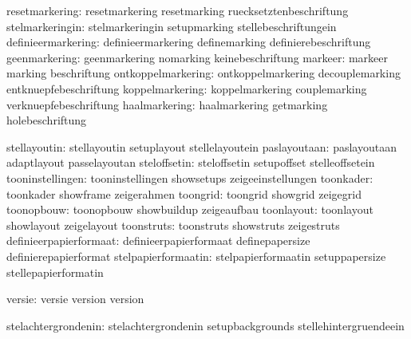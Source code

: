                resetmarkering:  resetmarkering               resetmarking
                                ruecksetztenbeschriftung
              stelmarkeringin:  stelmarkeringin              setupmarking
                                stellebeschriftungein
           definieermarkering:  definieermarkering           definemarking
                                definierebeschriftung
                geenmarkering:  geenmarkering                nomarking
                                keinebeschriftung
                      markeer:  markeer                      marking
                                beschriftung
           ontkoppelmarkering:  ontkoppelmarkering           decouplemarking
                                entknuepfebeschriftung
              koppelmarkering:  koppelmarkering              couplemarking
                                verknuepfebeschriftung
                haalmarkering:  haalmarkering                getmarking
                                holebeschriftung

                 stellayoutin:  stellayoutin                 setuplayout
                                stellelayoutein
                 paslayoutaan:  paslayoutaan                 adaptlayout
                                passelayoutan
                 steloffsetin:  steloffsetin                 setupoffset
                                stelleoffsetein
             tooninstellingen:  tooninstellingen             showsetups
                                zeigeeinstellungen
                    toonkader:  toonkader                    showframe
                                zeigerahmen
                     toongrid:  toongrid                     showgrid
                                zeigegrid  
                   toonopbouw:  toonopbouw                   showbuildup
                                zeigeaufbau
                   toonlayout:  toonlayout                   showlayout
                                zeigelayout
                   toonstruts:  toonstruts                   showstruts
                                zeigestruts
       definieerpapierformaat:  definieerpapierformaat       definepapersize
                                definierepapierformat
          stelpapierformaatin:  stelpapierformaatin          setuppapersize
                                stellepapierformatin

                       versie:  versie                       version
                                version

          stelachtergrondenin:  stelachtergrondenin          setupbackgrounds
                                stellehintergruendeein

